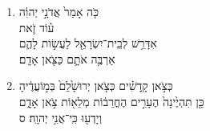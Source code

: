 \documentclass[12pt,a4paper,titlepage]{article}
\def \pslabelsep{-0.9em} %
\def \psleftmargin{0em} %
\begin{document}
\begin{enumerate}[leftmargin=\psleftmargin, labelsep = \pslabelsep, label={\arabic*}, font=\color{\pscolor}\small\textsuperscript, parsep=0em, itemsep=0em, topsep=0em ]
\item \texthebrew{כֹּ֤ה אָמַר֙ אֲדֹנָ֣י יְהוִ֔ה \\ ע֗וֹד זֹ֛את \\ אִדָּרֵ֥שׁ לְבֵֽית־יִשְׂרָאֵ֖ל לַעֲשׂ֣וֹת לָהֶ֑ם \\ אַרְבֶּ֥ה אֹתָ֛ם כַּצֹּ֖אן אָדָֽם׃}
\item \texthebrew{כְּצֹ֣אן קָֽדָשִׁ֗ים כְּצֹ֤אן יְרוּשָׁ֙לִַם֙ בְּמ֣וֹעֲדֶ֔יהָ \\ כֵּ֤ן תִּהְיֶ֙ינָה֙ הֶעָרִ֣ים הֶחֳרֵב֔וֹת מְלֵא֖וֹת צֹ֣אן אָדָ֑ם \\ וְיָדְע֖וּ כִּֽי־אֲנִ֥י יְהוָֽה׃ ס}
\end{enumerate}

\section*{}
\end{document}
